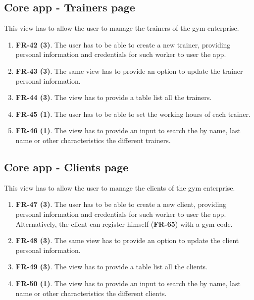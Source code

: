 \documentclass[a4paper, 12pt, oneside]{book}
\begin{document}
\subsection{Core app - Trainers page}
This view has to allow the user to manage the trainers of the gym enterprise.
\begin{enumerate}[label = -]
	\item \textbf{FR-42 (3)}. The user has to be able to create a new trainer, providing personal information and credentials for such worker to user the app.
	\item \textbf{FR-43 (3)}. The same view has to provide an option to update the trainer personal information.
	\item \textbf{FR-44 (3)}. The view has to provide a table list all the trainers.
	\item \textbf{FR-45 (1)}. The user has to be able to set the working hours of each trainer.
	\item \textbf{FR-46 (1)}. The view has to provide an input to search the by name, last name or other characteristics the different trainers.
\end{enumerate}
\subsection{Core app - Clients page}
This view has to allow the user to manage the clients of the gym enterprise.
\begin{enumerate}[label = -]
	\item \textbf{FR-47 (3)}. The user has to be able to create a new client, providing personal information and credentials for such worker to user the app. Alternatively, the client can register himself (\textbf{FR-65}) with a gym code.
	\item \textbf{FR-48 (3)}. The same view has to provide an option to update the client personal information.
	\item \textbf{FR-49 (3)}. The view has to provide a table list all the clients.
	\item \textbf{FR-50 (1)}. The view has to provide an input to search the by name, last name or other characteristics the different clients.
\end{enumerate}
\end{document}
